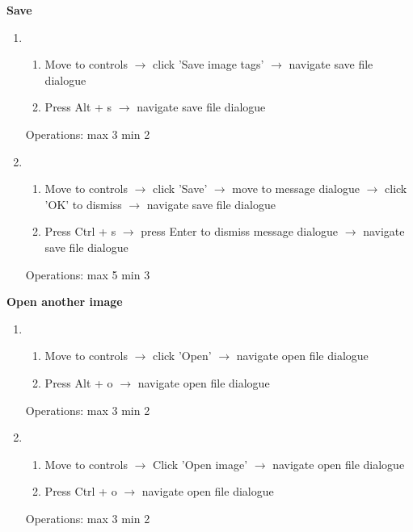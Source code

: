 \documentclass[a4paper,11pt,oneside]{article}
\begin{document}
{\bf Save}
\begin{enumerate}
    \item
    \begin{enumerate}
        \item Move to controls $\rightarrow$ click 'Save image tags' $\rightarrow$ navigate save file dialogue
        \item Press Alt + s $\rightarrow$ navigate save file dialogue
    \end{enumerate}
    Operations: max 3 min 2
    \item
    \begin{enumerate}
        \item Move to controls $\rightarrow$ click 'Save' $\rightarrow$ move to message dialogue $\rightarrow$ click 'OK' to dismiss $\rightarrow$ navigate save file dialogue
        \item Press Ctrl + s $\rightarrow$ press Enter to dismiss message dialogue $\rightarrow$ navigate save file dialogue
    \end{enumerate}
    Operations: max 5 min 3
\end{enumerate}

{\bf Open another image}
\begin{enumerate}
    \item
    \begin{enumerate}
        \item Move to controls $\rightarrow$ click 'Open' $\rightarrow$ navigate open file dialogue
        \item Press Alt + o $\rightarrow$ navigate open file dialogue
    \end{enumerate}
    Operations: max 3 min 2
    \item
    \begin{enumerate}
        \item Move to controls $\rightarrow$ Click 'Open image' $\rightarrow$ navigate open file dialogue
        \item Press Ctrl + o $\rightarrow$ navigate open file dialogue
    \end{enumerate}
    Operations: max 3 min 2
\end{enumerate}
\end{document}
